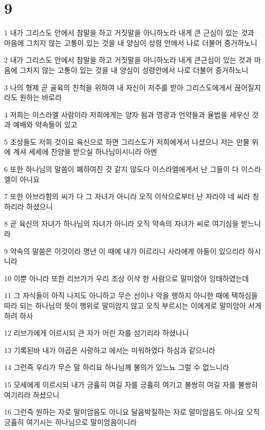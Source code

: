 \chapter{9}

\par 1 내가 그리스도 안에서 참말을 하고 거짓말을 아니하노라 내게 큰 근심이 있는 것과 마음에 그치지 않는 고통이 있는 것을 내 양심이 성령 안에서 나로 더불어 증거하노니
\par 2 내가 그리스도 안에서 참말을 하고 거짓말을 아니하노라 내게 큰근심이 있는 것과 마음에 그치지 않는 고통이 있는 것을 내 양심이 성령안에서 나로 더불어 증거하노니
\par 3 나의 형제 곧 골육의 친척을 위하여 내 자신이 저주를 받아 그리스도에게서 끊어질지라도 원하는 바로라
\par 4 저희는 이스라엘 사람이라 저희에게는 양자 됨과 영광과 언약들과 율법을 세우신 것과 예배와 약속들이 있고
\par 5 조상들도 저희 것이요 육신으로 하면 그리스도가 저희에게서 나셨으니 저는 만물 위에 계셔 세세에 찬양을 받으실 하나님이시니라 아멘
\par 6 또한 하나님의 말씀이 폐하여진 것 같지 않도다 이스라엘에게서 난 그들이 다 이스라엘이 아니요
\par 7 또한 아브라함의 씨가 다 그 자녀가 아니라 오직 이삭으로부터 난 자라야 네 씨라 칭하리라 하셨으니
\par 8 곧 육신의 자녀가 하나님의 자녀가 아니라 오직 약속의 자녀가 씨로 여기심을 받느니라
\par 9 약속의 말씀은 이것이라 명년 이 때에 내가 이르리니 사라에게 아들이 있으리라 하시니라
\par 10 이뿐 아니라 또한 리브가가 우리 조상 이삭 한 사람으로 말미암아 잉태하였는데
\par 11 그 자식들이 아직 나지도 아니하고 무슨 선이나 악을 행하지 아니한 때에 택하심을 따라 되는 하나님의 뜻이 행위로 말미암지 않고 오직 부르시는 이에게로 말미암아 서게 하려 하사
\par 12 리브가에게 이르시되 큰 자가 어린 자를 섬기리라 하셨나니
\par 13 기록된바 내가 야곱은 사랑하고 에서는 미워하였다 하심과 같으니라
\par 14 그런즉 우리가 무슨 말 하리요 하나님께 불의가 있느뇨 그럴 수 없느니라
\par 15 모세에게 이르시되 내가 긍휼히 여길 자를 긍휼히 여기고 불쌍히 여길 자를 불쌍히 여기리라 하셨으니
\par 16 그런즉 원하는 자로 말미암음도 아니요 달음박질하는 자로 말미암음도 아니요 오직 긍휼히 여기시는 하나님으로 말미암음이니라
